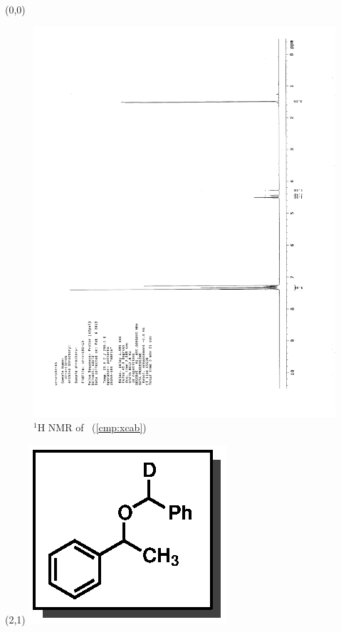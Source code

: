 \begin{textblock}{20}(0,0)
\begin{figure}[htb]
\caption{$^1$H NMR of \CMPxcab\ (\ref{cmp:xcab})}
\includegraphics[scale=0.75, trim = 0mm 0mm 0mm 5mm,
clip]{chp_alkylation/images/nmr/xcabH}
\vspace{-100pt}
\end{figure}
\end{textblock}
\begin{textblock}{1}(2,1)
\includegraphics[scale=0.8, angle=90]{chp_alkylation/images/xcab}
\end{textblock}
